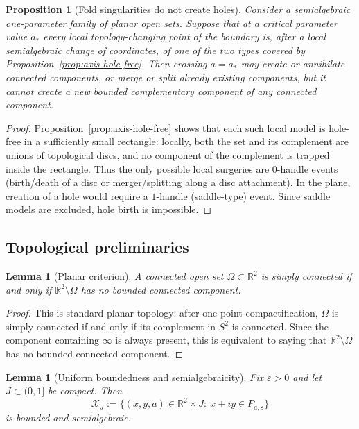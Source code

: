 \documentclass[11pt]{article}
\newtheorem{lemma}[theorem]{Lemma}
\newtheorem{proposition}[theorem]{Proposition}
\newcommand{\R}{\mathbb{R}}
\begin{document}
\begin{proposition}[Fold singularities do not create holes]\label{prop:fold-no-hole}
Consider a semialgebraic one-parameter family of planar open sets. Suppose that at a critical parameter value \(a_*\) every local topology-changing point of the boundary is, after a local semialgebraic change of coordinates, of one of the two types covered by Proposition~\ref{prop:axis-hole-free}. Then crossing \(a=a_*\) may create or annihilate connected components, or merge or split already existing components, but it cannot create a new bounded complementary component of any connected component.
\end{proposition}

\begin{proof}
Proposition~\ref{prop:axis-hole-free} shows that each such local model is hole-free in a sufficiently small rectangle: locally, both the set and its complement are unions of topological discs, and no component of the complement is trapped inside the rectangle. Thus the only possible local surgeries are \(0\)-handle events (birth/death of a disc or merger/splitting along a disc attachment). In the plane, creation of a hole would require a \(1\)-handle (saddle-type) event. Since saddle models are excluded, hole birth is impossible.
\end{proof}

\subsection*{Topological preliminaries}

\begin{lemma}[Planar criterion]\label{lem:planar-criterion}
A connected open set \(\Omega\subset\R^2\) is simply connected if and only if \(\R^2\setminus\Omega\) has no bounded connected component.
\end{lemma}

\begin{proof}
This is standard planar topology: after one-point compactification, \(\Omega\) is simply connected if and only if its complement in \(S^2\) is connected. Since the component containing \(\infty\) is always present, this is equivalent to saying that \(\R^2\setminus\Omega\) has no bounded connected component.
\end{proof}

\begin{lemma}[Uniform boundedness and semialgebraicity]\label{lem:semialg}
Fix \(\varepsilon>0\) and let \(J\subset (0,1]\) be compact. Then
\[
\mathcal X_J
:=
\{(x,y,a)\in \R^2\times J:\ x+iy\in P_{a,\varepsilon}\}
\]
is bounded and semialgebraic.
\end{lemma}
\end{document}
